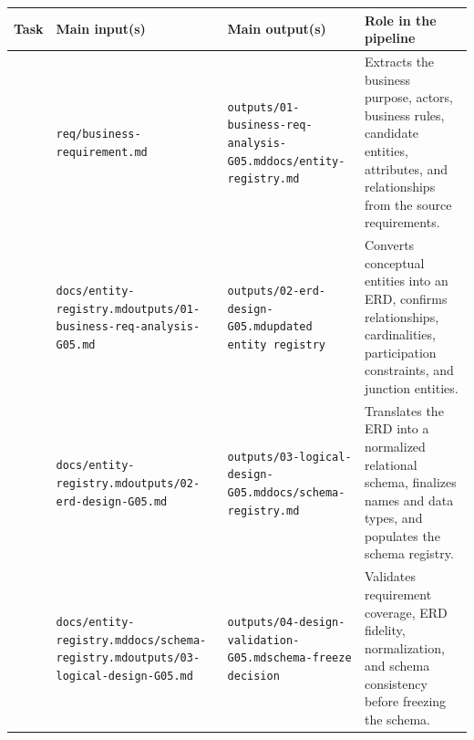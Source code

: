 \begin{table}[htbp]
\centering
\scriptsize
\renewcommand{\arraystretch}{1.22}
\setlength{\tabcolsep}{3pt}
\begin{tabularx}{\textwidth}{>{\centering\arraybackslash}p{0.75cm}
                            >{\raggedright\arraybackslash}p{3.25cm}
                            >{\raggedright\arraybackslash}p{3.65cm}
                            >{\raggedright\arraybackslash}X}
\toprule
\textbf{Task} & \textbf{Main input(s)} & \textbf{Main output(s)} & \textbf{Role in the pipeline} \\
\midrule
01 & \texttt{req/business-}\linebreak\texttt{requirement.md} & \texttt{outputs/01-business-}\linebreak\texttt{req-analysis-G05.md}\linebreak\texttt{docs/entity-}\linebreak\texttt{registry.md} & Extracts the business purpose, actors, business rules, candidate entities, attributes, and relationships from the source requirements. \\

02 & \texttt{docs/entity-}\linebreak\texttt{registry.md}\linebreak\texttt{outputs/01-business-}\linebreak\texttt{req-analysis-G05.md} & \texttt{outputs/02-erd-}\linebreak\texttt{design-G05.md}\linebreak\texttt{updated entity registry} & Converts conceptual entities into an ERD, confirms relationships, cardinalities, participation constraints, and junction entities. \\

03 & \texttt{docs/entity-}\linebreak\texttt{registry.md}\linebreak\texttt{outputs/02-erd-}\linebreak\texttt{design-G05.md} & \texttt{outputs/03-logical-}\linebreak\texttt{design-G05.md}\linebreak\texttt{docs/schema-}\linebreak\texttt{registry.md} & Translates the ERD into a normalized relational schema, finalizes names and data types, and populates the schema registry. \\

04 & \texttt{docs/entity-}\linebreak\texttt{registry.md}\linebreak\texttt{docs/schema-}\linebreak\texttt{registry.md}\linebreak\texttt{outputs/03-logical-}\linebreak\texttt{design-G05.md} & \texttt{outputs/04-design-}\linebreak\texttt{validation-G05.md}\linebreak\texttt{schema-freeze decision} & Validates requirement coverage, ERD fidelity, normalization, and schema consistency before freezing the schema. \\


\end{tabularx}
\end{table}
